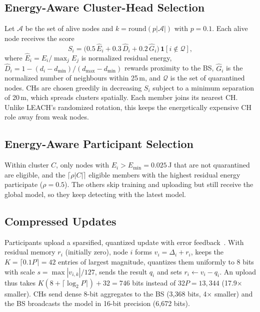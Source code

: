 \documentclass[journal]{IEEEtran}
\begin{document}
\subsection{Energy-Aware Cluster-Head Selection}
Let $\mathcal{A}$ be the set of alive nodes and $k=\mathrm{round}(p|\mathcal{A}|)$ with $p=0.1$. Each alive node receives the score
\begin{equation}
S_i=\big(0.5\,\hat E_i+0.3\,\hat D_i+0.2\,\hat G_i\big)\,\mathbf{1}[i\notin\mathcal{Q}],
\end{equation}
where $\hat E_i=E_i/\max_j E_j$ is normalized residual energy, $\hat D_i=1-(d_i-d_{\min})/(d_{\max}-d_{\min})$ rewards proximity to the BS, $\hat G_i$ is the normalized number of neighbours within 25\,m, and $\mathcal{Q}$ is the set of quarantined nodes. CHs are chosen greedily in decreasing $S_i$ subject to a minimum separation of 20\,m, which spreads clusters spatially. Each member joins its nearest CH. Unlike LEACH's randomized rotation, this keeps the energetically expensive CH role away from weak nodes.

\subsection{Energy-Aware Participant Selection}
Within cluster $C$, only nodes with $E_i>E_{\min}=0.025$\,J that are not quarantined are eligible, and the $\lceil\rho|C|\rceil$ eligible members with the highest residual energy participate ($\rho=0.5$). The others skip training and uploading but still receive the global model, so they keep detecting with the latest model.

\subsection{Compressed Updates}
Participants upload a sparsified, quantized update with error feedback~\cite{stich2018,lin2018dgc}. With residual memory $r_i$ (initially zero), node $i$ forms $v_i=\Delta_i+r_i$, keeps the $K=\lceil0.1P\rceil=42$ entries of largest magnitude, quantizes them uniformly to 8 bits with scale $s=\max|v_{i,k}|/127$, sends the result $q_i$ and sets $r_i\leftarrow v_i-q_i$. An upload thus takes $K(8+\lceil\log_2P\rceil)+32=746$ bits instead of $32P=13{,}344$ (17.9$\times$ smaller). CHs send dense 8-bit aggregates to the BS (3,368 bits, 4$\times$ smaller) and the BS broadcasts the model in 16-bit precision (6,672 bits).
\end{document}
